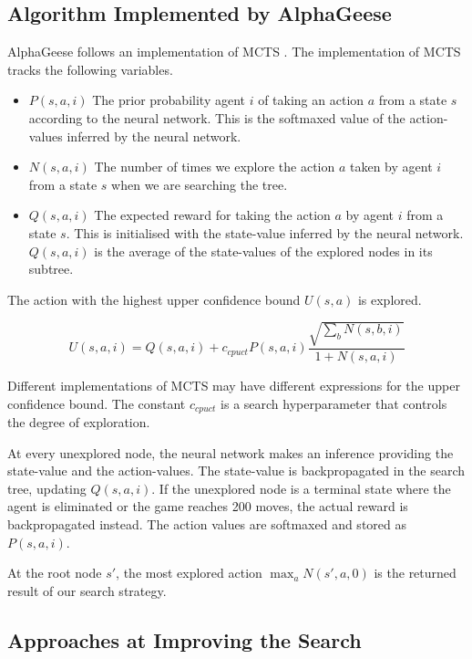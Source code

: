 
\subsection{Algorithm Implemented by AlphaGeese}
\label{subsection_alphageese_algo}

AlphaGeese \cite{notebook_alphageese_baseline} follows an implementation of MCTS \cite{repo_MCTS} \cite{paper_othello}. The implementation of MCTS tracks the following variables.

\begin{itemize}
    \item $P(s,a,i)$ The prior probability agent $i$ of taking an action $a$ from a state $s$ according to the neural network. This is the softmaxed value of the action-values inferred by the neural network.
    \item $N(s,a,i)$ The number of times we explore the action $a$ taken by agent $i$ from a state $s$ when we are searching the tree.
    \item $Q(s,a,i)$ The expected reward for taking the action $a$ by agent $i$ from a state $s$. This is initialised with the state-value inferred by the neural network. $Q(s,a,i)$ is the average of the state-values of the explored nodes in its subtree.
\end{itemize}

The action with the highest upper confidence bound $U(s,a)$ is explored.

$$
U(s,a,i) = Q(s,a,i) + c_{cpuct} P(s,a,i) \dfrac{\sqrt{\sum_b N(s,b,i)}}{1 + N(s,a,i)}
$$

Different implementations of MCTS may have different expressions for the upper confidence bound. The constant $c_{cpuct}$ is a search hyperparameter that controls the degree of exploration.

At every unexplored node, the neural network makes an inference providing the state-value and the action-values. The state-value is backpropagated in the search tree, updating $Q(s,a,i)$. If the unexplored node is a terminal state where the agent is eliminated or the game reaches 200 moves, the actual reward is backpropagated instead. The action values are softmaxed and stored as $P(s,a,i)$.

At the root node $s'$, the most explored action $\max_{a} N(s',a,0)$ is the returned result of our search strategy.


\subsection{Approaches at Improving the Search}
\label{subsection_mcts_improvements}

